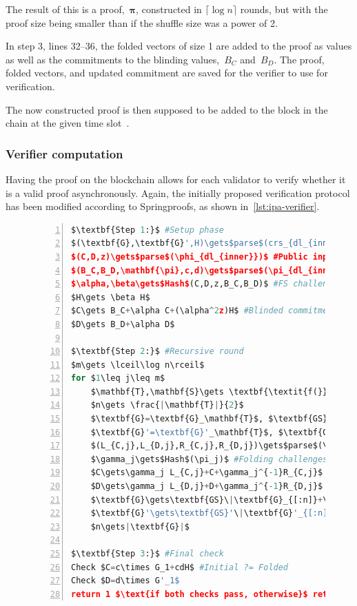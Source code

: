 The result of this is a proof,~$\mathbf{\pi}$, constructed in $\lceil \log n \rceil$ rounds, but with the proof size being smaller than if the shuffle size was a power of 2.

In step 3, lines 32--36, the folded vectors of size 1 are added to the proof as values as well as the commitments to the blinding values,~$B_C$ and~$B_D$.
The proof, folded vectors, and updated commitment are saved for the verifier to use for verification.


The now constructed proof is then supposed to be added to the block in the chain at the given time slot~\cite{Whisk2024}.

\subsubsection*{Verifier computation}
Having the proof on the blockchain allows for each validator to verify whether it is a valid proof asynchronously.
Again, the initially proposed verification protocol has been modified according to Springproofs, as shown in~\autoref{lst:ipa-verifier}.

\begin{figure}[!htb]
\begin{lstlisting}[language=Python,mathescape=true,label={lst:ipa-verifier},numbers=left,caption={Verifier computation for CAAU-IPA in CAAUrdleproofs},captionpos=b,frame=single]
$\textbf{Step 1:}$ #Setup phase
$(\textbf{G},\textbf{G}',H)\gets$parse$(crs_{dl_{inner}})$
$(C,D,z)\gets$parse$(\phi_{dl_{inner}})$ #Public input
$(B_C,B_D,\mathbf{\pi},c,d)\gets$parse$(\pi_{dl_{inner}})$ #From prover
$\alpha,\beta\gets$Hash$(C,D,z,B_C,B_D)$ #FS challenges
$H\gets \beta H$
$C\gets B_C+\alpha C+(\alpha^2z)H$ #Blinded commitments
$D\gets B_D+\alpha D$

$\textbf{Step 2:}$ #Recursive round
$m\gets \lceil\log n\rceil$
for $1\leq j\leq m$
    $\mathbf{T},\mathbf{S}\gets \textbf{\textit{f(}}n\textbf{\textit{)}}$ #Scheme function
    $n\gets \frac{|\mathbf{T}|}{2}$
    $\textbf{G}=\textbf{G}_\mathbf{T}$, $\textbf{GS}=\textbf{G}_\mathbf{S}$ #Vector splitting
    $\textbf{G}'=\textbf{G}'_\mathbf{T}$, $\textbf{GS}'=\textbf{G}'_\mathbf{S}$
    $(L_{C,j},L_{D,j},R_{C,j},R_{D,j})\gets$parse$(\pi_j)$ #Proof elem
    $\gamma_j\gets$Hash$(\pi_j)$ #Folding challenges
    $C\gets\gamma_j L_{C,j}+C+\gamma_j^{-1}R_{C,j}$ #Update comms
    $D\gets\gamma_j L_{D,j}+D+\gamma_j^{-1}R_{D,j}$
    $\textbf{G}\gets\textbf{GS}\|\textbf{G}_{[:n]}+\gamma_j\textbf{G}_{[n:]}$ #Next round vectors
    $\textbf{G}'\gets\textbf{GS}'\|\textbf{G}'_{[:n]}+\gamma_j^{-1}\textbf{G}'_{[n:]}$
    $n\gets|\textbf{G}|$

$\textbf{Step 3:}$ #Final check
Check $C=c\times G_1+cdH$ #Initial ?= Folded
Check $D=d\times G'_1$
return 1 $\text{if both checks pass, otherwise}$ return 0
\end{lstlisting}
\label{fig:ipa-verifier}
\end{figure}

